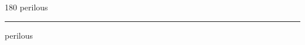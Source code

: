 
\begin{frame}
\begin{center}
\begin{turn}{180}
{\fontsize{2.5cm}{1em}\selectfont perilous}
\end{turn}
\vspace{1em}\par  
\hrule
\vspace{1em}\par  
{\fontsize{2.5cm}{1em}\selectfont perilous}
\end{center}
\end{frame}
